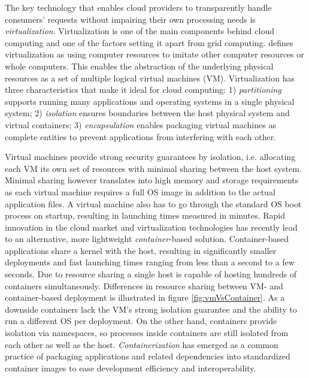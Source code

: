 \documentclass[utf8,english]{gradu3}
\begin{document}
The key technology that enables cloud providers to transparently handle consumers' requests without impairing their own processing needs is \textit{virtualization}. Virtualization is one of the main components behind cloud computing and one of the factors setting it apart from grid computing. \textcite{sareen13cloudTypes} defines virtualization as using computer resources to imitate other computer resources or whole computers. This enables the abstraction of the underlying physical resources as a set of multiple logical virtual machines (VM). Virtualization has three characteristics that make it ideal for cloud computing: 1) \textit{partitioning} supports running many applications and operating systems in a single physical system; 2) \textit{isolation} ensures boundaries between the host physical system and virtual containers; 3) \textit{encapsulation} enables packaging virtual machines as complete entities to prevent applications from interfering with each other.

Virtual machines provide strong security guarantees by isolation, i.e. allocating each VM its own set of resources with minimal sharing between the host system. Minimal sharing however translates into high memory and storage requirements as each virtual machine requires a full OS image in addition to the actual application files. A virtual machine also has to go through the standard OS boot process on startup, resulting in launching times measured in minutes. Rapid innovation in the cloud market and virtualization technologies has recently lead to an alternative, more lightweight \textit{container}-based solution. Container-based applications share a kernel with the host, resulting in significantly smaller deployments and fast launching times ranging from less than a second to a few seconds. Due to resource sharing a single host is capable of hosting hundreds of containers simultaneously. Differences in resource sharing between VM- and container-based deployment is illustrated in figure \ref{fig:vmVsContainer}. As a downside containers lack the VM's strong isolation guarantee and the ability to run a different OS per deployment. On the other hand, containers provide isolation via namespaces, so processes inside containers are still isolated from each other as well as the host. \textit{Containerization} has emerged as a common practice of packaging applications and related dependencies into standardized container images to ease development efficiency and interoperability. \parencite{pahl15containerization}
\end{document}
